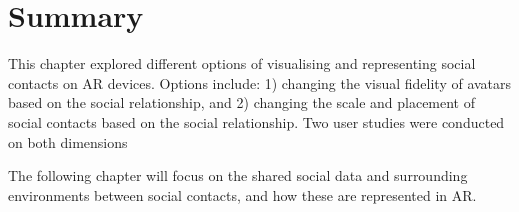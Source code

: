 \section{Summary}

This chapter explored different options of visualising and representing social contacts on AR devices. Options include: 1) changing the visual fidelity of avatars based on the social relationship, and 2) changing the scale and placement of social contacts based on the social relationship. Two user studies were conducted on both dimensions 

The following chapter will focus on the shared social data and surrounding environments between social contacts, and how these are represented in AR. 